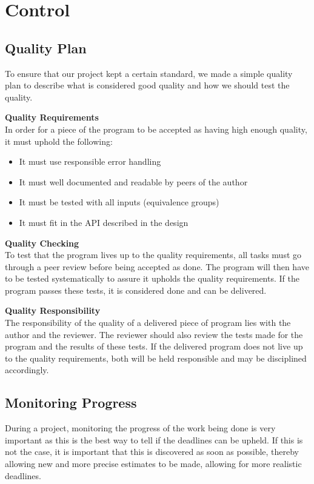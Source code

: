 \section{Control}
\subsection{Quality Plan}
To ensure that our project kept a certain standard, we made a simple quality plan to describe what is considered good quality and how we should test the quality.

\textbf{Quality Requirements}\\
In order for a piece of the program to be accepted as having high enough quality, it must uphold the following:
\begin{itemize}
\item It must use responsible error handling
\item It must well documented and readable by peers of the author
\item It must be tested with all inputs (equivalence groups)
\item It must fit in the API described in the design
\end{itemize}


\textbf{Quality Checking}\\
To test that the program lives up to the quality requirements, all tasks must go through a peer review before being accepted as done. The program will then have to be tested systematically to assure it upholds the quality requirements. If the program passes these tests, it is considered done and can be delivered.

\textbf{Quality Responsibility}\\
The responsibility of the quality of a delivered piece of program lies with the author and the reviewer. The reviewer should also review the tests made for the program and the results of these tests. If the delivered program does not live up to the quality requirements, both will be held responsible and may be disciplined accordingly.

\subsection{Monitoring Progress}
During a project, monitoring the progress of the work being done is very important as this is the best way to tell if the deadlines can be upheld. If this is not the case, it is important that this is discovered as soon as possible, thereby allowing new and more precise estimates to be made, allowing for more realistic deadlines.

